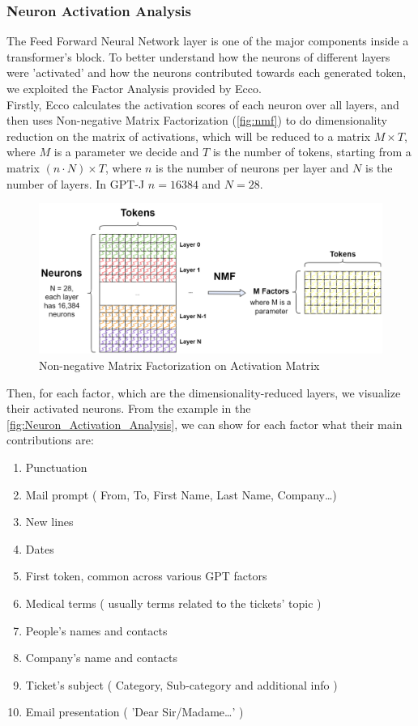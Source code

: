 \subsubsection*{Neuron Activation Analysis}
The Feed Forward Neural Network layer is one of the major components inside a transformer's block. To better understand how the neurons of different layers were 'activated' and how the neurons contributed towards each generated token, we exploited the Factor Analysis provided by Ecco. \\
Firstly, Ecco calculates the activation scores of each neuron over all layers, and then uses Non-negative Matrix Factorization (\autoref{fig:nmf}) to do dimensionality reduction on the matrix of activations, which will be reduced to a matrix $M{\times}T$, where $M$ is a parameter we decide and $T$ is the number of tokens, starting from a matrix $ ( n \cdot N ){\times}T$, where $n$ is the number of neurons per layer and $N$ is the number of layers. In GPT-J  $n = 16384$ and $N = 28$. \\
\begin{figure}[h] 
    \includegraphics[width=\textwidth]{images/nmf.drawio}
    \caption{Non-negative Matrix Factorization on Activation Matrix}
    \label{fig:nmf}
\end{figure}
Then, for each factor, which are the dimensionality-reduced layers, we visualize their activated neurons.
From the example in the \autoref{fig:Neuron_Activation_Analysis}, we can show for each factor what their main contributions are:
\begin{enumerate}
    \item Punctuation
    \item Mail prompt ( From, To, First Name, Last Name, Company\dots)
    \item New lines
    \item Dates
    \item First token, common across various GPT factors
    \item Medical terms ( usually terms related to the tickets' topic )
    \item People's names and contacts
    \item Company's name and contacts
    \item Ticket's subject ( Category, Sub-category and additional info )
    \item Email presentation ( 'Dear Sir/Madame\dots' )
\end{enumerate}

